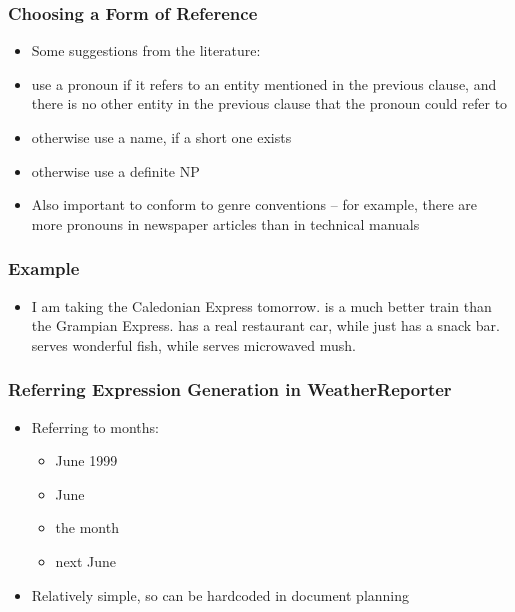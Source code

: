 \documentclass[compress,color=usenames]{beamer}
\begin{document}
\begin{frame}
\frametitle{
Choosing a Form of Reference}

\label{f15}
\begin{itemize}
\item {{Some suggestions from the literature:}}
\item {{use a pronoun if it refers to an entity mentioned in the previous clause, and there is no other entity in the previous clause that the pronoun could refer to}}
\item {{otherwise use a name, if a short one exists}}
\item {{otherwise use a definite NP}}
\item {{Also important to conform to genre conventions -- for example, there are more pronouns in newspaper articles than in technical manuals}}
\end{itemize}
\end{frame}

\begin{frame}
\frametitle{
Example}

\label{f17}
\begin{itemize}
\item {{I am taking the Caledonian Express tomorrow.   is a much better train than the Grampian Express.   has a real restaurant car, while just has a snack bar.    serves wonderful fish, while  serves microwaved mush.}}
\end{itemize}
\end{frame}

\begin{frame}
\frametitle{
Referring Expression Generation in WeatherReporter}

\label{f19}
\begin{itemize}
\item {{Referring to months:}}
\begin{itemize}
\item June 1999
\item June
\item the month
\item next June
\end{itemize}
\item {{Relatively simple, so can be hardcoded in document planning}}
\end{itemize}
\end{frame}
\end{document}
